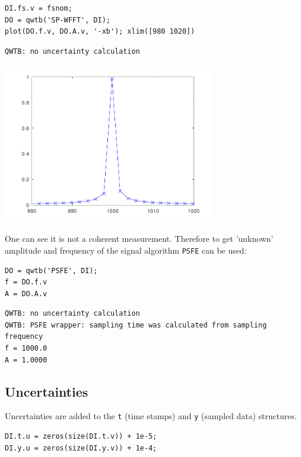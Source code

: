 \begin{lstlisting}
DI.fs.v = fsnom;
DO = qwtb('SP-WFFT', DI);
plot(DO.f.v, DO.A.v, '-xb'); xlim([980 1020])
\end{lstlisting}
\begin{lstlisting}[language={},xleftmargin=5pt,frame=none]
QWTB: no uncertainty calculation

\end{lstlisting}
\begin{center}
\includegraphics[width=0.7\textwidth]{qwtb_examples_published/qwtb_example_1-1.pdf}
\end{center}


One can see it is not a coherent measurement. Therefore to get 'unknown'
amplitude and frequency of the signal algorithm \texttt{PSFE} can be used:

\begin{lstlisting}
DO = qwtb('PSFE', DI);
f = DO.f.v
A = DO.A.v
\end{lstlisting}
\begin{lstlisting}[language={},xleftmargin=5pt,frame=none]
QWTB: no uncertainty calculation
QWTB: PSFE wrapper: sampling time was calculated from sampling frequency
f = 1000.0
A = 1.0000

\end{lstlisting}


{}
\subsection*{Uncertainties}



Uncertainties are added to the \texttt{t} (time stamps) and \texttt{y} (sampled data) structures.

\begin{lstlisting}
DI.t.u = zeros(size(DI.t.v)) + 1e-5;
DI.y.u = zeros(size(DI.y.v)) + 1e-4;
\end{lstlisting}


